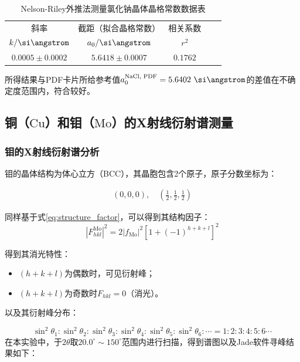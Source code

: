 \documentclass{thuemp}
\begin{document}
\begin{table}[H]
    \centering
    \captionnamefont{\wuhao\bf\heiti}
    \captiontitlefont{\wuhao\bf\heiti}
    \caption{Nelson-Riley外推法测量氯化钠晶体晶格常数数据表}
    \label{tab:nacl_xrd_extrapol}
    \liuhao
    \begin{tabular}{ccccc}
        \toprule
        斜率 & 截距（拟合晶格常数） & 相关系数 \\
        $k/\text{\si\angstrom}$ & $a_0/\text{\si\angstrom}$ & $r^2$ \\
        \midrule
        $0.0005 \pm 0.0002$ & $5.6418 \pm 0.0007$ & $0.1762$ \\
        \bottomrule
    \end{tabular}
\end{table}

所得结果与PDF卡片所给参考值$a_0^{\text{NaCl, PDF}} = 5.6402~\text{\si\angstrom}$的差值在不确定度范围内，符合较好。

\subsection{铜（$\text{Cu}$）和钼（$\text{Mo}$）的X射线衍射谱测量}

\subsubsection{钼的X射线衍射谱分析}

钼的晶体结构为体心立方（BCC），其晶胞包含2个原子，原子分数坐标为：

\begin{align*}
(0,0,0),\quad \left(\frac{1}{2},\frac{1}{2},\frac{1}{2}\right)
\end{align*}

同样基于式\ref{eq:structure_factor}，可以得到其结构因子：
\begin{equation}
    |F_{hkl}^{\text{Mo}}|^2 = 2|f_{\text{Mo}}|^2 \left[1+(-1)^{h+k+l}\right]^2
    \label{eq:mo_struct_fac}
\end{equation}

得到其消光特性：

\begin{itemize}
    \item $(h+k+l)$为偶数时，可见衍射峰；
    \item $(h+k+l)$为奇数时$F_{hkl}=0$（消光）。
\end{itemize}

以及其衍射峰分布：

\begin{equation}
    \sin^2\theta_1 : \sin^2\theta_2: \sin^2\theta_3 : \sin^2\theta_4 : \sin^2\theta_5 : \sin^2\theta_6 : \cdots =
    1 : 2 : 3 : 4 : 5 : 6 \cdots
    \label{eq:mo_diff_patt}
\end{equation}
在本实验中，于$2\theta$取$20.0^\circ \sim 150^\circ$范围内进行扫描，得到谱图以及Jade软件寻峰结果如下：
\end{document}
